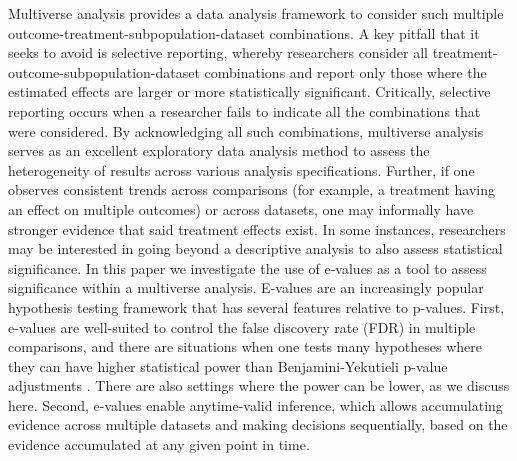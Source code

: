 \documentclass[pdflatex,sn-mathphys-num]{sn-jnl}%
\theoremstyle{thmstyleone}%
\theoremstyle{thmstyletwo}%
\theoremstyle{thmstylethree}%
\begin{document}
Multiverse analysis \citep{steegen:2016} provides a data analysis framework to consider such multiple outcome-treatment-subpopulation\color{blue}-dataset \color{black} combinations.
A key pitfall that it seeks to avoid is selective reporting, whereby researchers consider all treatment-outcome-subpopulation\color{blue}-dataset \color{black}  
combinations and report only those where the estimated effects are larger or more statistically significant. Critically, selective reporting occurs when a researcher fails to indicate all the combinations that were considered.
By acknowledging all such combinations, multiverse analysis serves as an excellent exploratory data analysis method to assess the heterogeneity of results across various analysis specifications.
\color{blue} Further, if one observes consistent trends across comparisons (for example, a treatment having an effect on multiple outcomes) or across datasets, one may informally have stronger evidence that said treatment effects exist. \color{black}
In some instances, researchers may be interested in going beyond a descriptive analysis to also assess statistical significance. 
\color{blue} In this paper we investigate the use of e-values as a tool to assess significance within a multiverse analysis. \color{black}
E-values are an increasingly popular hypothesis testing framework that has several features relative to p-values.
\color{blue} First, e-values are well-suited to control the false discovery rate (FDR) in multiple comparisons, and there are situations when one tests many hypotheses where they can have higher statistical power than Benjamini-Yekutieli p-value adjustments \citep{wang_ruodu:2022,benjamini:2001}. There are also settings where the power can be lower, as we discuss here. Second, e-values enable anytime-valid inference, which allows accumulating evidence across multiple datasets and making decisions sequentially, based on the evidence accumulated at any given point in time. %
\end{document}
